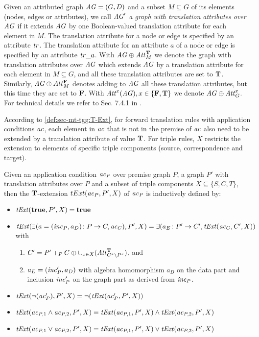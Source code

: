 \begin{remark}
\label{rem:sec-mt-tgg:tr_attr}
Given an attributed graph $\mathit{AG}=(G,D)$ and a subset $M \subseteq G$ of its elements (nodes, edges or attributes), we call \emph{$\mathit{AG}'$ a graph with translation attributes over $\mathit{AG}$} if it extends $\mathit{AG}$ by one Boolean-valued translation attribute for each element in $M$.
The translation attribute for a node or edge is specified by an attribute $\mathit{tr}$.
The translation attribute for an attribute $a$ of a node or edge is specified by an attribute $\mathit{tr}\_a$.
With $\mathit{AG} \oplus \mathit{Att}^\mathbf{T}_M$ we denote the graph with translation attributes over $\mathit{AG}$ which extends $\mathit{AG}$ by a translation attribute for each element in $M \subseteq G$, and all these translation attributes are set to $\mathbf{T}$.
Similarly, $\mathit{AG} \oplus Att^\mathbf{F}_M$ denotes adding to $\mathit{AG}$ all these translation attributes, but this time they are set to $\mathbf{F}$.
With $\mathit{Att}^x(\mathit{AG}),x \in \{\mathbf{F},\mathbf{T}\}$ we denote $\mathit{AG} \oplus \mathit{Att}^x_G$.
For technical details we refer to Sec. 7.4.1 in \cite{FAGT2}.
\envEndMarker
\end{remark}

According to \cref{def:sec-mt-tgg:T-Ext}, for forward translation rules with application conditions $\mathit{ac}$, each element in $\mathit{ac}$ that is not in the premise of $\mathit{ac}$ also need to be extended by a translation attribute of value $\mathbf{T}$.
For triple rules, $X$ restricts the extension to elements of specific triple components (source, correspondence and target).

\begin{definition}
\label{def:sec-mt-tgg:T-Ext}
Given an application condition $\mathit{ac}_P$ over premise graph $P$, a graph $P'$ with translation attributes over $P$ and a subset of triple components $X \subseteq \{S,C,T\}$, then the $\mathbf{T}$-extension $tExt(\mathit{ac}_P,P',X)$ of $\mathit{ac}_P$ is inductively defined by:
\begin{itemize}
  \item $\mathit{tExt}(\textbf{true},P',X)=\textbf{true}$
  \item $\mathit{tExt}(\exists(a=(\mathit{inc}_P,a_D)\colon P \to C, \mathit{ac}_C),P',X)=\exists(a_E\colon P' \to C',\mathit{tExt}(\mathit{ac}_C,C',X))$ with
  \begin{enumerate}
    \item $C'=P' +_P C \oplus \cup_{x \in X}(\mathit{Att}^\mathbf{T}_{C^x\setminus P^x})$, and
    \item $a_E=(\mathit{inc}'_P,a_D)$ with algebra homomorphism $a_D$ on the data part and inclusion $\mathit{inc}'_P$ on the graph part as derived from $\mathit{inc}_P$.
  \end{enumerate}
\item $\mathit{tExt}(\neg(\mathit{ac}'_P),P',X)=\neg(\mathit{tExt}(\mathit{ac}'_P,P',X))$
  \item $\mathit{tExt}(\mathit{ac}_{P,1} \wedge \mathit{ac}_{P,2},P',X)=\mathit{tExt}(\mathit{ac}_{P,1},P',X) \wedge \mathit{tExt}(\mathit{ac}_{P,2},P',X)$
  \item $\mathit{tExt}(\mathit{ac}_{P,1} \vee \mathit{ac}_{P,2},P',X)=\mathit{tExt}(\mathit{ac}_{P,1},P',X) \vee \mathit{tExt}(\mathit{ac}_{P,2},P',X)$
  \envEndMarker
\end{itemize}
\end{definition}

